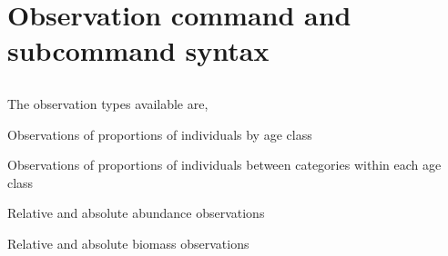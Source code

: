\subsection{}


\subsection{}


\subsection{\label{sec:estimation-syntax-MCMC}}


\subsection{}


\subsection{}


\subsection{}


\section{Observation command and subcommand syntax\label{sec:observation-syntax}}


\subsection{}

The observation types available are,

\begin{description}
  \item Observations of proportions of individuals by age class
  \item Observations of proportions of individuals between categories within each age class
  \item Relative and absolute abundance observations
  \item Relative and absolute biomass observations
\end{description}

